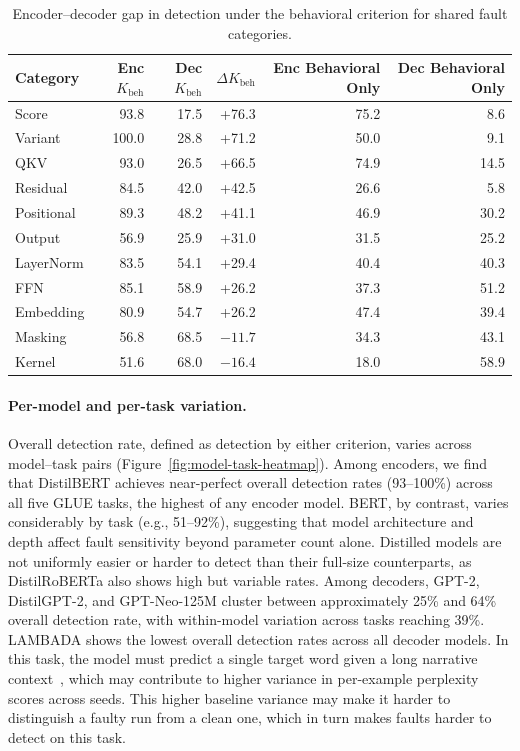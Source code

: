 \begin{table}[!htbp]
\caption{Encoder--decoder gap in detection under the behavioral criterion for shared fault categories.}
\label{tab:enc-dec-gap}
\centering
\footnotesize
\renewcommand{\arraystretch}{0.90}
\begin{tabular}{@{} l r r r r r @{}}
\toprule
\textbf{Category} & \textbf{Enc $K_{\text{beh}}$} & \textbf{Dec $K_{\text{beh}}$} & \textbf{$\Delta K_{\text{beh}}$} & \textbf{Enc Behavioral Only} & \textbf{Dec Behavioral Only} \\
\midrule
Score       & 93.8 & 17.5 & +76.3 & 75.2 &  8.6 \\
Variant     & 100.0 & 28.8 & +71.2 & 50.0 &  9.1 \\
QKV         & 93.0 & 26.5 & +66.5 & 74.9 & 14.5 \\
Residual    & 84.5 & 42.0 & +42.5 & 26.6 &  5.8 \\
Positional  & 89.3 & 48.2 & +41.1 & 46.9 & 30.2 \\
Output      & 56.9 & 25.9 & +31.0 & 31.5 & 25.2 \\
LayerNorm   & 83.5 & 54.1 & +29.4 & 40.4 & 40.3 \\
FFN         & 85.1 & 58.9 & +26.2 & 37.3 & 51.2 \\
Embedding   & 80.9 & 54.7 & +26.2 & 47.4 & 39.4 \\
Masking     & 56.8 & 68.5 & $-11.7$ & 34.3 & 43.1 \\
Kernel      & 51.6 & 68.0 & $-16.4$ & 18.0 & 58.9 \\
\bottomrule
\end{tabular}
\end{table}

\paragraph{Per-model and per-task variation.}
Overall detection rate, defined as detection by either criterion, varies across model--task pairs (Figure~\ref{fig:model-task-heatmap}). Among encoders, we find that DistilBERT achieves near-perfect overall detection rates (93--100\%) across all five GLUE tasks, the highest of any encoder model. BERT, by contrast, varies considerably by task (e.g., 51--92\%), suggesting that model architecture and depth affect fault sensitivity beyond parameter count alone. Distilled models are not uniformly easier or harder to detect than their full-size counterparts, as DistilRoBERTa also shows high but variable rates. Among decoders, GPT-2, DistilGPT-2, and GPT-Neo-125M cluster between approximately 25\% and 64\% overall detection rate, with within-model variation across tasks reaching 39\%. LAMBADA shows the lowest overall detection rates across all decoder models. In this task, the model must predict a single target word given a long narrative context~\citep{paperno2016lambada}, which may contribute to higher variance in per-example perplexity scores across seeds. This higher baseline variance may make it harder to distinguish a faulty run from a clean one, which in turn makes faults harder to detect on this task.

